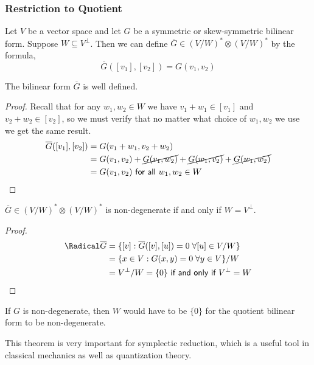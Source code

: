 \subsubsection{Restriction to Quotient}
\begin{defn} Let $V$ be a vector space and let $G$ be a symmetric or skew-symmetric bilinear form. Suppose $W \subseteq V^\perp$. Then we can define $\overline{G} \in (V/W)^*\otimes (V/W)^*$ by the formula,
\[\overline{G}([v_1],[v_2]) = G(v_1,v_2)\]
\end{defn}
\begin{lemma}
    The bilinear form $\overline{G}$ is well defined.
\end{lemma}
\begin{proof}
    Recall that for any $w_1,w_2 \in W$ we have $v_1+w_1\in [v_1]$ and $v_2+w_2\in[v_2]$, so we must verify that no matter what choice of $w_1,w_2$ we use we get the same result.
\begin{align*}\overline{G}([v_1],[v_2]) &= G(v_1+w_1,v_2+w_2) \\&= G(v_1,v_2)+\cancel{G(v_1,w_2)}+\cancel{G(w_1,v_2)}+\cancel{G(w_1,w_2)}\\ &= G(v_1,v_2) \textsf{ for all } w_1,w_2\in W\end{align*}
\end{proof}
\begin{thm}
    $\overline{G} \in (V/W)^*\otimes (V/W)^*$ is non-degenerate if and only if $W = V^\perp$.
\end{thm}
\begin{proof}
    \begin{align*}
        \Radical \overline{G} &= \{[v] : \overline{G}([v],[u])=0 \;\forall [u] \in V/W\}\\
        &= \{x \in V : G(x,y) = 0 \;\forall y \in V\}/W\\
        &= V^\perp/W = \{0\} \textsf{ if and only if } V^\perp = W
    \end{align*}
\end{proof}
\begin{remark*}
    If $G$ is non-degenerate, then $W$ would have to be $\{0\}$ for the quotient bilinear form to be non-degenerate.
\end{remark*}
\begin{physics*}
    This theorem is very important for symplectic reduction, which is a useful tool in classical mechanics as well as quantization theory.
\end{physics*}

